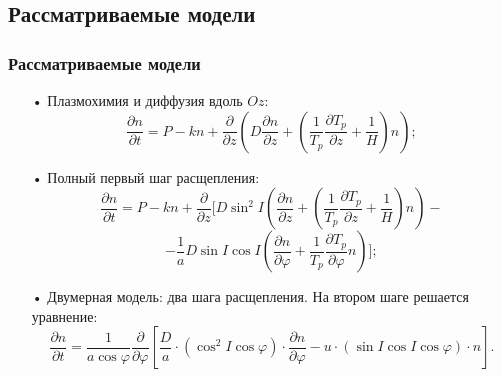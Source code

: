 \documentclass[9pt, apectratio=43,unicode]{beamer}
\begin{document}
\subsection{Рассматриваемые модели}
\begin{frame}\frametitle{Рассматриваемые модели}

\begin{itemize}
\item[•] Плазмохимия и диффузия вдоль $Oz$: 
$$\dfrac{\partial n}{\partial t} = P-kn+\dfrac{\partial}{\partial z}\left(D\dfrac{\partial n}{\partial z} + \left(\dfrac{1}{T_p}\dfrac{\partial T_p}{\partial z}+\dfrac{1}{H}\right) n\right);$$

\item[•] Полный первый шаг расщепления:
$$\dfrac{\partial n}{\partial t} =P-kn+\dfrac{\partial}{\partial z}\biggl[D\sin^2 I\left(\dfrac{\partial n}{\partial z}+\left(\dfrac{1}{T_p}\dfrac{\partial T_p}{\partial z}+\dfrac{1}{H}\right)n\right)-$$ $$-\dfrac{1}{a}D\sin I\cos I\left(\dfrac{\partial n}{\partial\varphi}+\dfrac{1}{T_p}\dfrac{\partial T_p}{\partial\varphi}n\right)\biggr];$$

\item[•] Двумерная модель: два шага расщепления.
На втором шаге решается уравнение:
$$\dfrac{\partial n}{\partial t} = \dfrac{1}{a\cos\varphi} \dfrac{\partial }{\partial \varphi}\left[\dfrac{D}{a}\cdot(\cos^2  I \cos\varphi)\cdot\dfrac{\partial n}{\partial \varphi} - u\cdot(\sin I \cos I \cos\varphi)\cdot n \right].$$ 
\end{itemize}
\end{frame}
\end{document}
